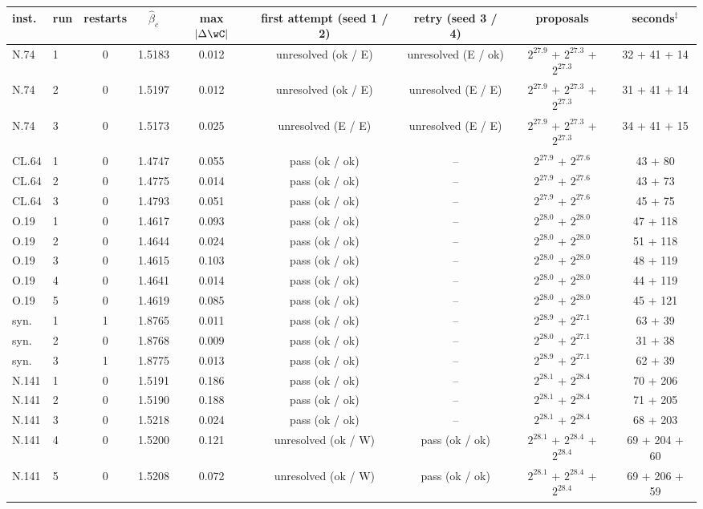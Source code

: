 \begin{tabular}{llccccccc}
\toprule
inst. & run & restarts & $\hat\beta_c$ & max $|\Delta\wC|$ & first attempt (seed 1 / 2) & retry (seed 3 / 4) & proposals & seconds$^\ddagger$ \\
\midrule
N.74 & 1 & 0 & 1.5183 & 0.012 & unresolved (ok / E) & unresolved (E / ok) & $2^{27.9}$ + $2^{27.3}$ + $2^{27.3}$ & 32 + 41 + 14 \\
N.74 & 2 & 0 & 1.5197 & 0.012 & unresolved (ok / E) & unresolved (E / E) & $2^{27.9}$ + $2^{27.3}$ + $2^{27.3}$ & 31 + 41 + 14 \\
N.74 & 3 & 0 & 1.5173 & 0.025 & unresolved (E / E) & unresolved (E / E) & $2^{27.9}$ + $2^{27.3}$ + $2^{27.3}$ & 34 + 41 + 15 \\
CL.64 & 1 & 0 & 1.4747 & 0.055 & pass (ok / ok) & -- & $2^{27.9}$ + $2^{27.6}$ & 43 + 80 \\
CL.64 & 2 & 0 & 1.4775 & 0.014 & pass (ok / ok) & -- & $2^{27.9}$ + $2^{27.6}$ & 43 + 73 \\
CL.64 & 3 & 0 & 1.4793 & 0.051 & pass (ok / ok) & -- & $2^{27.9}$ + $2^{27.6}$ & 45 + 75 \\
O.19 & 1 & 0 & 1.4617 & 0.093 & pass (ok / ok) & -- & $2^{28.0}$ + $2^{28.0}$ & 47 + 118 \\
O.19 & 2 & 0 & 1.4644 & 0.024 & pass (ok / ok) & -- & $2^{28.0}$ + $2^{28.0}$ & 51 + 118 \\
O.19 & 3 & 0 & 1.4615 & 0.103 & pass (ok / ok) & -- & $2^{28.0}$ + $2^{28.0}$ & 48 + 119 \\
O.19 & 4 & 0 & 1.4641 & 0.014 & pass (ok / ok) & -- & $2^{28.0}$ + $2^{28.0}$ & 44 + 119 \\
O.19 & 5 & 0 & 1.4619 & 0.085 & pass (ok / ok) & -- & $2^{28.0}$ + $2^{28.0}$ & 45 + 121 \\
syn. & 1 & 1 & 1.8765 & 0.011 & pass (ok / ok) & -- & $2^{28.9}$ + $2^{27.1}$ & 63 + 39 \\
syn. & 2 & 0 & 1.8768 & 0.009 & pass (ok / ok) & -- & $2^{28.0}$ + $2^{27.1}$ & 31 + 38 \\
syn. & 3 & 1 & 1.8775 & 0.013 & pass (ok / ok) & -- & $2^{28.9}$ + $2^{27.1}$ & 62 + 39 \\
N.141 & 1 & 0 & 1.5191 & 0.186 & pass (ok / ok) & -- & $2^{28.1}$ + $2^{28.4}$ & 70 + 206 \\
N.141 & 2 & 0 & 1.5190 & 0.188 & pass (ok / ok) & -- & $2^{28.1}$ + $2^{28.4}$ & 71 + 205 \\
N.141 & 3 & 0 & 1.5218 & 0.024 & pass (ok / ok) & -- & $2^{28.1}$ + $2^{28.4}$ & 68 + 203 \\
N.141 & 4 & 0 & 1.5200 & 0.121 & unresolved (ok / W) & pass (ok / ok) & $2^{28.1}$ + $2^{28.4}$ + $2^{28.4}$ & 69 + 204 + 60 \\
N.141 & 5 & 0 & 1.5208 & 0.072 & unresolved (ok / W) & pass (ok / ok) & $2^{28.1}$ + $2^{28.4}$ + $2^{28.4}$ & 69 + 206 + 59 \\
\bottomrule
\end{tabular}
